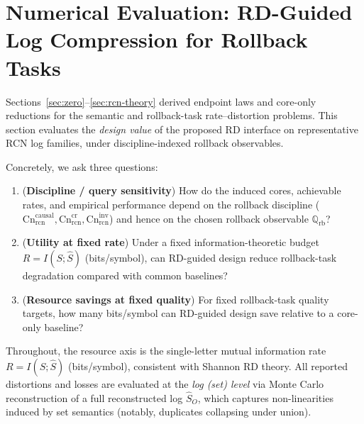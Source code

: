 \documentclass[twoside]{article}
\newcommand{\Cn}{\mathrm{Cn}}
\newcommand{\1}{\mathbf{1}}
\begin{document}

\section{Numerical Evaluation: RD-Guided Log Compression for Rollback Tasks}
\label{sec:rcn-exp}

Sections~\ref{sec:zero}--\ref{sec:rcn-theory} derived endpoint laws and core-only reductions for the
semantic and rollback-task rate--distortion problems. This section evaluates the \emph{design value}
of the proposed RD interface on representative RCN log families, under discipline-indexed rollback
observables.

Concretely, we ask three questions:

\begin{enumerate}[label={\textbf{Q\arabic*.}}, leftmargin=2.2em, itemsep=2pt, align=left]
  \item (\textbf{Discipline / query sensitivity})
  How do the induced cores, achievable rates, and empirical performance depend on the rollback
  discipline (\(\Cn^{\mathrm{causal}}_{\mathrm{rcn}},\Cn^{\mathrm{cr}}_{\mathrm{rcn}},\Cn^{\mathrm{inv}}_{\mathrm{rcn}}\))
  and hence on the chosen rollback observable \(\mathbb Q_{\mathrm{rb}}\)?

  \item (\textbf{Utility at fixed rate})
  Under a fixed information-theoretic budget \(R=I(S;\hat S)\) (bits/symbol), can RD-guided design
  reduce rollback-task degradation compared with common baselines?

  \item (\textbf{Resource savings at fixed quality})
  For fixed rollback-task quality targets, how many bits/symbol can RD-guided design save relative to
  a core-only baseline?
\end{enumerate}

Throughout, the resource axis is the single-letter mutual information rate \(R=I(S;\hat S)\) (bits/symbol),
consistent with Shannon RD theory. All reported distortions and losses are evaluated at the \emph{log (set) level}
via Monte Carlo reconstruction of a full reconstructed log \(\hat S_O\), which captures non-linearities induced by
set semantics (notably, duplicates collapsing under union).

\end{document}
